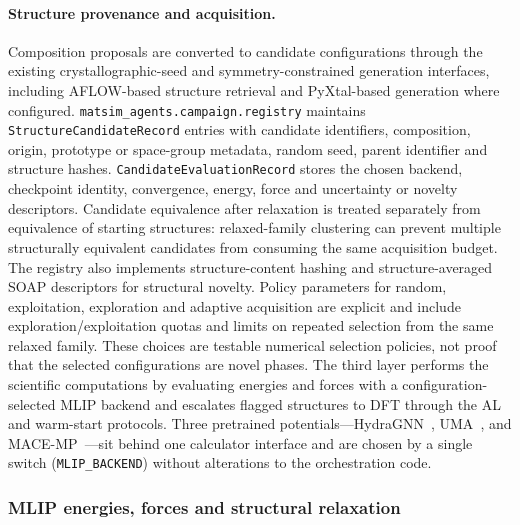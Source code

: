 \documentclass[11pt,a4paper]{article}
\def\ac#1{#1}%
\begin{document}
\paragraph{Structure provenance and acquisition.}
Composition proposals are converted to candidate configurations through the existing crystallographic-seed and symmetry-constrained generation interfaces, including AFLOW-based structure retrieval and PyXtal-based generation where configured. \texttt{matsim\_agents.campaign.registry} maintains \texttt{StructureCandidateRecord} entries with candidate identifiers, composition, origin, prototype or space-group metadata, random seed, parent identifier and structure hashes. \texttt{CandidateEvaluationRecord} stores the chosen backend, checkpoint identity, convergence, energy, force and uncertainty or novelty descriptors. Candidate equivalence after relaxation is treated separately from equivalence of starting structures: relaxed-family clustering can prevent multiple structurally equivalent candidates from consuming the same acquisition budget. The registry also implements structure-content hashing and structure-averaged \ac{SOAP} descriptors for structural novelty. Policy parameters for random, exploitation, exploration and adaptive acquisition are explicit and include exploration/exploitation quotas and limits on repeated selection from the same relaxed family. These choices are testable numerical selection policies, not proof that the selected configurations are novel phases.
The third layer performs the scientific computations by evaluating energies and forces with a
configuration-selected \ac{MLIP} backend and escalates flagged structures to
\ac{DFT} through the \ac{AL} and warm-start protocols. Three pretrained
potentials---HydraGNN~\cite{hydragnn,lupopasini2026exascalegfm},
UMA~\cite{wood2025uma}, and MACE-MP~\cite{batatia2022,batatia2023macemp}---sit
behind one calculator interface and are chosen by a single switch
(\texttt{MLIP\_BACKEND}) without alterations to the orchestration code.

\subsubsection{MLIP energies, forces and structural relaxation}
\end{document}
